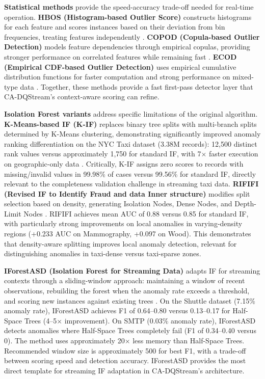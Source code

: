 \textbf{Statistical methods} provide the speed-accuracy trade-off needed for real-time operation. \textbf{HBOS (Histogram-based Outlier Score)} constructs histograms for each feature and scores instances based on their deviation from bin frequencies, treating features independently \citep{adbench2022}. \textbf{COPOD (Copula-based Outlier Detection)} models feature dependencies through empirical copulas, providing stronger performance on correlated features while remaining fast \citep{adbench2022}. \textbf{ECOD (Empirical CDF-based Outlier Detection)} uses empirical cumulative distribution functions for faster computation and strong performance on mixed-type data \citep{adbench2022}. Together, these methods provide a fast first-pass detector layer that CA-DQStream's context-aware scoring can refine.

\textbf{Isolation Forest variants} address specific limitations of the original algorithm. \textbf{K-Means-based IF (K-IF)} replaces binary tree splits with multi-branch splits determined by K-Means clustering, demonstrating significantly improved anomaly ranking differentiation on the NYC Taxi dataset (3.38M records): 12,500 distinct rank values versus approximately 1,750 for standard IF, with 7$\times$ faster execution on geographic-only data \citep{karczmarek2020kmeans}. Critically, K-IF assigns zero scores to records with missing/invalid values in 99.98\% of cases versus 99.56\% for standard IF, directly relevant to the completeness validation challenge in streaming taxi data. \textbf{RIFIFI (Revised IF to Identify Fraud and data Inner structure)} modifies split selection based on density, generating Isolation Nodes, Dense Nodes, and Depth-Limit Nodes \citep{yepmo2024rififi}. RIFIFI achieves mean AUC of 0.88 versus 0.85 for standard IF, with particularly strong improvements on local anomalies in varying-density regions (+0.233 AUC on Mammography, +0.097 on Wood). This demonstrates that density-aware splitting improves local anomaly detection, relevant for distinguishing anomalies in taxi-dense versus taxi-sparse zones.

\textbf{IForestASD (Isolation Forest for Streaming Data)} adapts IF for streaming contexts through a sliding-window approach: maintaining a window of recent observations, rebuilding the forest when the anomaly rate exceeds a threshold, and scoring new instances against existing trees \citep{togbe2020iforestasd}. On the Shuttle dataset (7.15\% anomaly rate), IForestASD achieves F1 of 0.64--0.80 versus 0.13--0.17 for Half-Space Trees (4--5$\times$ improvement). On SMTP (0.03\% anomaly rate), IForestASD detects anomalies where Half-Space Trees completely fail (F1 of 0.34--0.40 versus 0). The method uses approximately 20$\times$ less memory than Half-Space Trees. Recommended window size is approximately 500 for best F1, with a trade-off between scoring speed and detection accuracy. IForestASD provides the most direct template for streaming IF adaptation in CA-DQStream's architecture.

